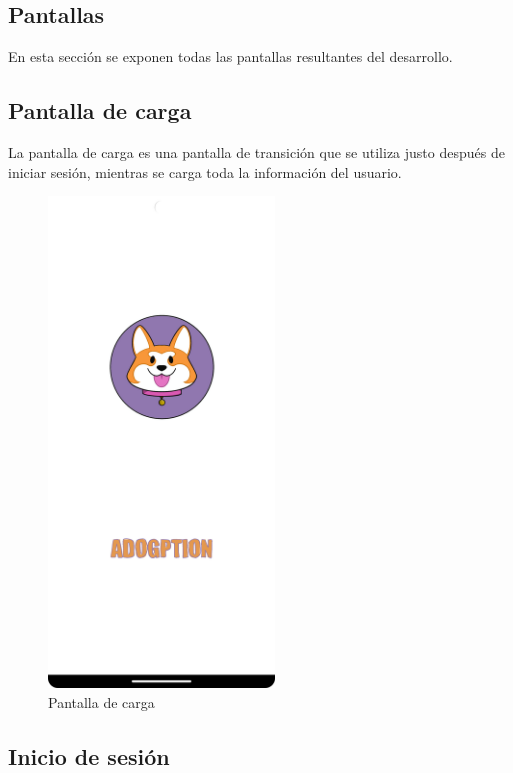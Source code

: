 \documentclass[a4paper, 12pt]{article}
\begin{document}
\newpage
\subsection{Pantallas}

En esta sección se exponen todas las pantallas resultantes del desarrollo.

\subsection*{Pantalla de carga}

La pantalla de carga es una pantalla de transición que se utiliza justo después de iniciar sesión, mientras se carga toda la información del usuario.

\begin{figure}[H]
	\begin{center}
		{\includegraphics[width=6cm]{app/Splashscreen.png}\par}
		\caption{Pantalla de carga}
	\end{center}
\end{figure}


\newpage
\subsection*{Inicio de sesión}
\end{document}
